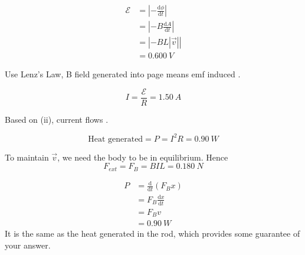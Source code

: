 \begin{solution}
    \begin{subsolution}
        \begin{align}
            \mathcal{E} &= \left|-\frac{\mathrm{d}\phi}{\mathrm{d}t}\right| \\
                        &= \left|-B\frac{\mathrm{d}A}{\mathrm{d}t}\right| \\
                        &= \left|-B L \left|\Vec{v}\right|\right| \\
                        &= \boxed{\qty{0.600}{V}}
        \end{align}
    \end{subsolution}
    \begin{subsolution}
        Use Lenz's Law, B field generated into page means emf induced .
    \end{subsolution}
    \begin{subsolution}
        \[I = \frac{\mathcal{E}}{R} = \boxed{\qty{1.50}{A}}\]
    \end{subsolution}
    \begin{subsolution}
        Based on (ii), current flows .
    \end{subsolution}
    \begin{subsolution}
        \[\text{Heat generated} = P = I^2R = \boxed{\qty{0.90}{W}}\]
    \end{subsolution}
    \begin{subsolution}
        To maintain $\Vec{v}$, we need the body to be in equilibrium. Hence
        \[F_{ext} = F_{B} = BIL = \boxed{\qty{0.180}{N}}\]
    \end{subsolution}
    \begin{subsolution}
        \begin{align}
            P &= \frac{\mathrm{d}}{\mathrm{d}t} (F_B x) \\
            &=  F_B \frac{\mathrm{d}x}{\mathrm{d}t} \\
            &= F_B v \\
            &= \boxed{\qty{0.90}{W}}
        \end{align}
        It is the same as the heat generated in the rod, which provides some guarantee of your answer. 
    \end{subsolution}
\end{solution}

